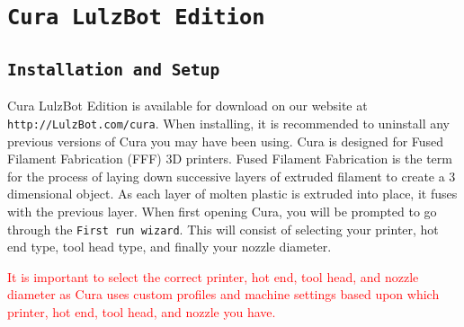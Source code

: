 %
%
%
%
%

\section{\texttt{Cura LulzBot Edition}}
\label{Cura}

\subsection{\texttt{Installation and Setup}}
Cura LulzBot Edition is available for download on our website at \texttt{http://LulzBot.com/cura}. When installing, it is recommended to uninstall any previous versions of Cura you may have been using. Cura is designed for Fused Filament Fabrication (FFF) 3D printers. Fused Filament Fabrication is the term for the process of laying down successive layers of extruded filament to create a 3 dimensional object. As each layer of molten plastic is extruded into place, it fuses with the previous layer.
When first opening Cura, you will be prompted to go through the \texttt{First run wizard}. This will consist of selecting your printer, hot end type, tool head type, and finally your nozzle diameter.

\textcolor{red}{It is important to select the correct printer, hot end, tool head, and nozzle diameter as Cura uses custom profiles and machine settings based upon which printer, hot end, tool head, and nozzle you have.}

